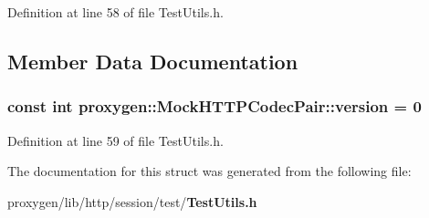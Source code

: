 Definition at line 58 of file Test\+Utils.\+h.



\subsection{Member Data Documentation}
\subsubsection[{version}]{\setlength{\rightskip}{0pt plus 5cm}const int proxygen\+::\+Mock\+H\+T\+T\+P\+Codec\+Pair\+::version = 0\hspace{0.3cm}{\ttfamily [static]}}\label{structproxygen_1_1MockHTTPCodecPair_a0b91a165adb686ae4f0cc7858b1074dc}


Definition at line 59 of file Test\+Utils.\+h.



The documentation for this struct was generated from the following file\+:\begin{DoxyCompactItemize}
\item 
proxygen/lib/http/session/test/{\bf Test\+Utils.\+h}\end{DoxyCompactItemize}
